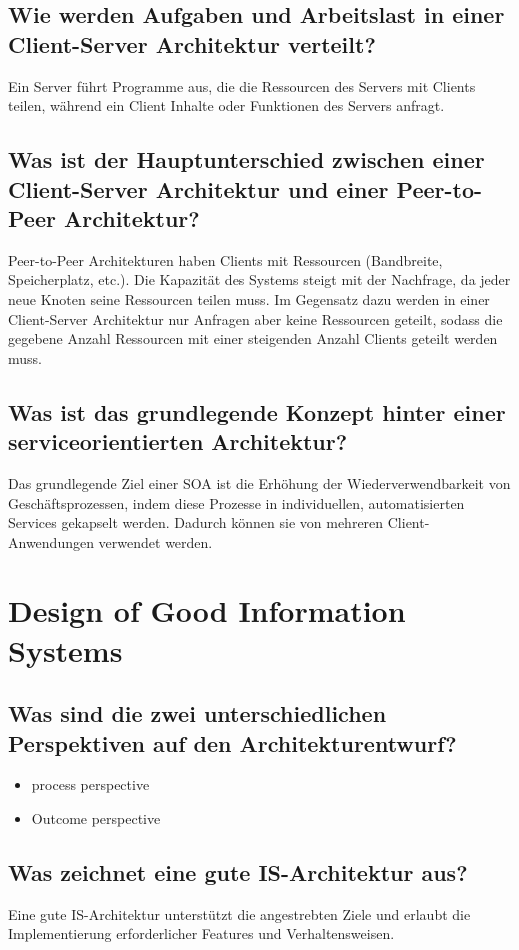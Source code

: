 \documentclass{article}
\begin{document}
\subsection{Wie werden Aufgaben und Arbeitslast in einer Client-Server Architektur verteilt?}
Ein Server führt Programme aus, die die Ressourcen des Servers mit Clients teilen, während ein Client Inhalte oder Funktionen des Servers anfragt.
\subsection{Was ist der Hauptunterschied zwischen einer Client-Server Architektur und einer Peer-to-Peer Architektur?}
Peer-to-Peer Architekturen haben Clients mit Ressourcen (Bandbreite, Speicherplatz, etc.). Die Kapazität des Systems steigt mit der Nachfrage, da jeder neue Knoten seine Ressourcen teilen muss. Im Gegensatz dazu werden in einer Client-Server Architektur nur Anfragen aber keine Ressourcen geteilt, sodass die gegebene Anzahl Ressourcen mit einer steigenden Anzahl Clients geteilt werden muss.
\subsection{Was ist das grundlegende Konzept hinter einer serviceorientierten Architektur?}
Das grundlegende Ziel einer SOA ist die Erhöhung der Wiederverwendbarkeit von Geschäftsprozessen, indem diese Prozesse in individuellen, automatisierten Services gekapselt werden. Dadurch können sie von mehreren Client-Anwendungen verwendet werden.

\section{Design of Good Information Systems}
\subsection{Was sind die zwei unterschiedlichen Perspektiven auf den Architekturentwurf?}
\begin{itemize}
    \item process perspective 
    \item Outcome perspective
\end{itemize}
\subsection{Was zeichnet eine gute IS-Architektur aus?}
Eine gute IS-Architektur unterstützt die angestrebten Ziele und erlaubt die Implementierung erforderlicher Features und Verhaltensweisen.
\end{document}
